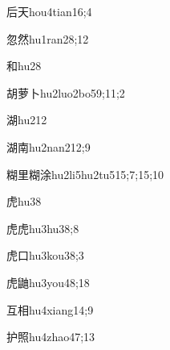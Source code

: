 \begin{verbete}{后天}{hou4tian1}{6;4}
\end{verbete}

\begin{verbete}{忽然}{hu1ran2}{8;12}
\end{verbete}

\begin{verbete}{和}{hu2}{8}
\end{verbete}

\begin{verbete}{胡萝卜}{hu2luo2bo5}{9;11;2}
\end{verbete}

\begin{verbete}{湖}{hu2}{12}
\end{verbete}

\begin{verbete}{湖南}{hu2nan2}{12;9}
\end{verbete}

\begin{verbete}{糊里糊涂}{hu2li5hu2tu5}{15;7;15;10}
\end{verbete}

\begin{verbete}{虎}{hu3}{8}
\end{verbete}

\begin{verbete}{虎虎}{hu3hu3}{8;8}
\end{verbete}

\begin{verbete}{虎口}{hu3kou3}{8;3}
\end{verbete}

\begin{verbete}{虎鼬}{hu3you4}{8;18}
\end{verbete}

\begin{verbete}{互相}{hu4xiang1}{4;9}
\end{verbete}

\begin{verbete}{护照}{hu4zhao4}{7;13}
\end{verbete}

